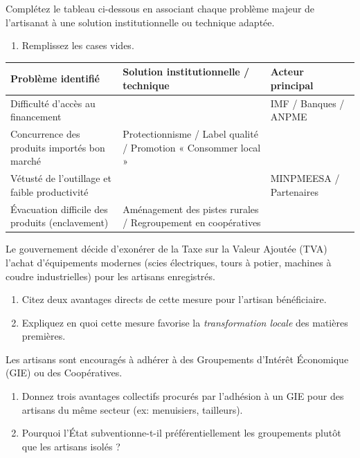 \documentclass[11pt]{article}
\begin{document}
\begin{exercice}
Complétez le tableau ci-dessous en associant chaque problème majeur de l'artisanat à une solution institutionnelle ou technique adaptée.
\begin{enumerate}
    \item Remplissez les cases vides.
\end{enumerate}
\begin{tabularx}{\linewidth}{|X|X|X|}
\hline
\textbf{Problème identifié} & \textbf{Solution institutionnelle / technique} & \textbf{Acteur principal} \\
\hline
Difficulté d'accès au financement & \underline{\hspace{4cm}} & IMF / Banques / ANPME \\
\hline
Concurrence des produits importés bon marché & Protectionnisme / Label qualité / Promotion « Consommer local » & \underline{\hspace{3cm}} \\
\hline
Vétusté de l'outillage et faible productivité & \underline{\hspace{4cm}} & MINPMEESA / Partenaires \\
\hline
Évacuation difficile des produits (enclavement) & Aménagement des pistes rurales / Regroupement en coopératives & \underline{\hspace{3cm}} \\
\hline
\end{tabularx}
\end{exercice}

\begin{exercice}
Le gouvernement décide d'exonérer de la Taxe sur la Valeur Ajoutée (TVA) l'achat d'équipements modernes (scies électriques, tours à potier, machines à coudre industrielles) pour les artisans enregistrés.
\begin{enumerate}
    \item Citez deux avantages directs de cette mesure pour l'artisan bénéficiaire.
    \item Expliquez en quoi cette mesure favorise la \textit{transformation locale} des matières premières.
\end{enumerate}
\end{exercice}

\begin{exercice}
Les artisans sont encouragés à adhérer à des Groupements d'Intérêt Économique (GIE) ou des Coopératives.
\begin{enumerate}
    \item Donnez trois avantages collectifs procurés par l'adhésion à un GIE pour des artisans du même secteur (ex: menuisiers, tailleurs).
    \item Pourquoi l'État subventionne-t-il préférentiellement les groupements plutôt que les artisans isolés ?
\end{enumerate}
\end{exercice}
\end{document}
